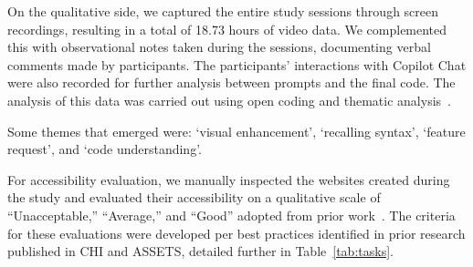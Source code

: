 On the qualitative side, we captured the entire study sessions through screen recordings, resulting in a total of 18.73 hours of video data. We complemented this with observational notes taken during the sessions, documenting verbal comments made by participants. The participants' interactions with Copilot Chat were also recorded for further analysis between prompts and the final code.
The analysis of this data was carried out using open coding and thematic analysis~\cite{clarke2017thematic}. \begin{highlight} Some themes that emerged were: `visual enhancement', `recalling syntax', `feature request', and `code understanding'.\end{highlight} For accessibility evaluation, we manually inspected the websites created during the study and evaluated their accessibility on a qualitative scale of ``Unacceptable,'' ``Average,'' and ``Good'' adopted from prior work~\cite{pillai2022website}. The criteria for these evaluations were developed per best practices identified in prior research published in CHI and ASSETS, detailed further in Table~\ref{tab:tasks}.

